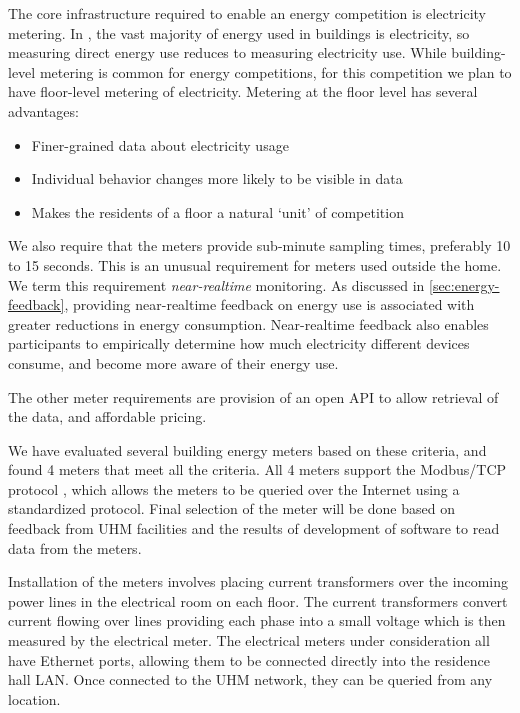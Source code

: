 The core infrastructure required to enable an energy competition is electricity metering. In \Hawaii, the vast majority of energy used in buildings is electricity, so measuring direct energy use reduces to measuring electricity use. While building-level metering is common for energy competitions, for this competition we plan to have floor-level metering of electricity. Metering at the floor level has several advantages:

\begin{itemize}
	\item Finer-grained data about electricity usage
	\item Individual behavior changes more likely to be visible in data
	\item Makes the residents of a floor a natural `unit' of competition
\end{itemize}

We also require that the meters provide sub-minute sampling times, preferably 10 to 15 seconds. This is an unusual requirement for meters used outside the home. We term this requirement \emph{near-realtime} monitoring. As discussed in \autoref{sec:energy-feedback}, providing near-realtime feedback on energy use is associated with greater reductions in energy consumption. Near-realtime feedback also enables participants to empirically determine how much electricity different devices consume, and become more aware of their energy use.

The other meter requirements are provision of an open API to allow retrieval of the data, and affordable pricing.

We have evaluated several building energy meters based on these criteria, and found 4 meters that meet all the criteria. All 4 meters support the Modbus/TCP protocol \cite{modbus-website}, which allows the meters to be queried over the Internet using a standardized protocol. Final selection of the meter will be done based on feedback from UHM facilities and the results of development of software to read data from the meters.

Installation of the meters involves placing current transformers over the incoming power lines in the electrical room on each floor. The current transformers convert current flowing over lines providing each phase into a small voltage which is then measured by the electrical meter. The electrical meters under consideration all have Ethernet ports, allowing them to be connected directly into the residence hall LAN. Once connected to the UHM network, they can be queried from any location.

